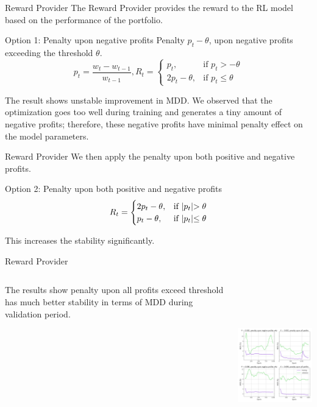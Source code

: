 \begin{frame}{Reward Provider}
The Reward Provider provides the reward to the RL model based on the performance of the portfolio.
\begin{block}{Option 1: Penalty upon negative profits}
Penalty \(p_t-\theta\), upon negative profits exceeding the threshold \(\theta\). 
\[
p_t = \frac{w_t-w_{t-1}}{w_{t-1}}
, 
R_t = 
\begin{cases}
    p_t,&\text{if  }p_t > -\theta\\
    2p_t - \theta ,&\text{if  }p_t \leq  \theta
\end{cases}
\]
\end{block}
\alert{
The result shows unstable improvement in MDD. We observed that the optimization goes too well during training and generates a tiny amount of negative profits; therefore, these negative profits have minimal penalty effect on the model parameters.
}

\end{frame}

\begin{frame}{Reward Provider}
We then apply the penalty upon both positive and negative profits. 
\begin{block}{Option 2: Penalty upon both positive and negative profits}
\[
R_t = 
\begin{cases}
    2p_t - \theta,&\text{if  }    $$|p_t|$$ > \theta\\
    p_t - \theta ,&\text{if  } $$|p_t|$$\leq  \theta
\end{cases}
\]
\end{block}
\alert{This increases the stability significantly.}
\end{frame}



\begin{frame}{Reward Provider}
\begin{columns}
\begin{column}{0.35\textwidth}
The results show penalty upon all profits exceed threshold has much better stability in terms of MDD during validation period. 

\end{column}
\begin{column}{0.65\textwidth}
\begin{center}
      \includegraphics[height=7cm]{images/penalty_negtive_profits_compare.png}
\end{center}
\end{column}
\end{columns}
\end{frame}


